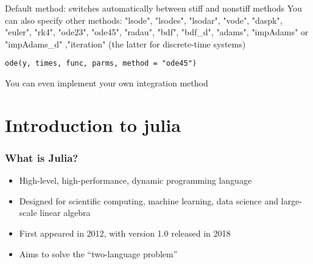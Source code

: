 \documentclass[aspectratio=169]{beamer}\usepackage[]{graphicx}\usepackage[]{xcolor}
\begin{document}
\begin{frame}[fragile]{Default method: }
 switches automatically between stiff and nonstiff methods
\vfill
You can also specify other methods: "lsode", "lsodes", "lsodar", "vode", "daspk", "euler", "rk4", "ode23", "ode45", "radau", "bdf", "bdf\_d", "adams", "impAdams" or "impAdams\_d" ,"iteration" (the latter for discrete-time systems)

\begin{lstlisting}
ode(y, times, func, parms, method = "ode45")    
\end{lstlisting}
You can even implement your own integration method
\end{frame}

\section{Introduction to julia}

\begin{frame}
  \frametitle{What is Julia?}
  \begin{itemize}
    \item High-level, high-performance, dynamic programming language
    \vfill
    \item Designed for scientific computing, machine learning, data science and large-scale linear algebra
    \vfill
    \item First appeared in 2012, with version 1.0 released in 2018
    \vfill
    \item Aims to solve the ``two-language problem''
  \end{itemize}
\end{frame}
\end{document}
